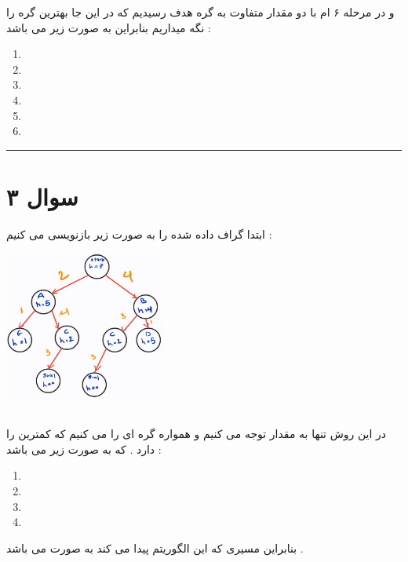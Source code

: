 \documentclass{article}
\begin{document}
و در مرحله ۶ ام با دو مقدار متفاوت 
به گره هدف رسیدیم که در این جا بهترین گره را نگه میداریم بنابراین 
به صورت زیر می باشد : 
\begin{center}
	\begin{enumerate}
		\item {}
		\item {}
		\item {}
		\item {}
		\item {}
		\item {}
		\end{enumerate}
\end{center}
\hrule
\newpage
\section*{سوال ۳}
ابتدا گراف داده شده را به صورت زیر بازنویسی می کنیم  : 
	\begin{center}
	\includegraphics[width=0.4\textwidth]{q3p1}
\end{center}


\subsection*{\textcolor{red}{}}
در این روش تنها به مقدار 
توجه می کنیم و همواره گره ای را 
می کنیم که کمترین 
را دارد . که به صورت زیر می باشد : 
\begin{center}
	\begin{enumerate}
		\item {}
		\item {}
		\item {}
		\item {}
	\end{enumerate}
\end{center}
بنابراین مسیری که این الگوریتم پیدا می کند به صورت 
می باشد  . 
\end{document}
